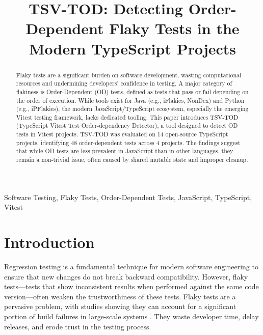 \documentclass[10pt, conference]{IEEEtran}
\begin{document}
\title{TSV-TOD: Detecting Order-Dependent Flaky Tests in the Modern TypeScript Projects}

\author{
}

\maketitle

\begin{abstract}
Flaky tests are a significant burden on software development, wasting computational resources and undermining developers' confidence in testing. A major category of flakiness is Order-Dependent (OD) tests, defined as tests that pass or fail depending on the order of execution. While tools exist for Java (e.g., iFlakies, NonDex) and Python (e.g., iPFlakies), the modern JavaScript/TypeScript ecosystem, especially the emerging Vitest testing framework, lacks dedicated tooling. This paper introduces TSV-TOD (TypeScript Vitest Test Order-dependency Detector), a tool designed to detect OD tests in Vitest projects. TSV-TOD was evaluated on 14 open-source TypeScript projects, identifying 48 order-dependent tests across 4 projects. The findings suggest that while OD tests are less prevalent in JavaScript than in other languages, they remain a non-trivial issue, often caused by shared mutable state and improper cleanup.
\end{abstract}

\begin{IEEEkeywords}
Software Testing, Flaky Tests, Order-Dependent Tests, JavaScript, TypeScript, Vitest
\end{IEEEkeywords}

\section{Introduction}
Regression testing is a fundamental technique for modern software engineering to ensure that new changes do not break backward compatibility. However, flaky tests---tests that show inconsistent results when performed against the same code version---often weaken the trustworthiness of these tests. Flaky tests are a pervasive problem, with studies showing they can account for a significant portion of build failures in large-scale systems \cite{luo2014empirical}. They waste developer time, delay releases, and erode trust in the testing process.
\end{document}
